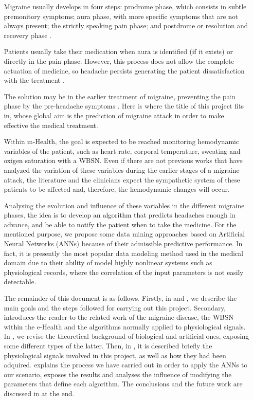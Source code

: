 Migraine usually develops in four steps: prodrome phase, which consists in subtle premonitory symptoms; aura phase, with more specific symptoms that are not always present; the strictly speaking pain phase; and postdrome or resolution and recovery phase \cite{SENmigaura, CUNcefmig}.

Patients usually take their medication when aura is identified (if it exists) or directly in the pain phase. However, this process does not allow the complete actuation of medicine, so headache persists generating the patient dissatisfaction with the treatment \cite{IBCinsatisfacc}.

The solution may be in the earlier treatment of migraine, preventing the pain phase by the pre-headache symptoms \cite{MigAgudaEarlyTreat}. Here is where the title of this project fits in, whose global aim is the prediction of migraine attack in order to make effective the medical treatment.

Within m-Health, the goal is expected to be reached monitoring hemodynamic variables of the patient, such as heart rate, corporal temperature, sweating and oxigen saturation with a WBSN. Even if there are not previous works that have analyzed the variation of these variables during the earlier stages of a migraine attack, the literature and the clinicians expect the sympathetic system of these patients to be affected and, therefore, the hemodynamic changes will occur. 

Analysing the evolution and influence of these variables in the different migraine phases, the idea is to develop an algorithm that predicts headaches enough in advance, and be able to notify the patient when to take the medicine. For the mentioned purpose, we propose some data mining approaches based on Artificial Neural Networks (ANNs) because of their admissible predictive performance. In fact, it is presently the most popular data modeling method used in the medical domain due to their ability of model highly nonlinear systems such as physiological records, where the correlation of the input parameters is not easily detectable.


The remainder of this document is as follows. Firstly, in  and , we describe the main goals and the steps followed for carrying out this project. Secondary,  introduces the reader to the related work of the migraine disease, the WBSN within the e-Health and the algorithms normally applied to physiological signals. In , we revise the theoretical background of biological and artificial ones, exposing some different types of the latter. Then, in , it is described briefly the physiological signals involved in this project, as well as how they had been adquired.  explains the process we have carried out in order to apply the ANNs to our scenario, exposes the results and analyses the influence of modifying the parameters that define each algorithm. The conclusions and the future work are discussed in  at the end.
